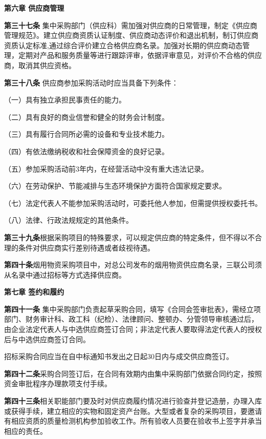 \begin{center}
\textbf{第六章 \quad  供应商管理}
\end{center}

\textbf{第三十七条 }\quad 集中采购部门（供应科）需加强对供应商的日常管理，制定《供应商管理规范》。建立供应商资质认证制度、供应商动态评价和退出机制，制订供应商资质认定标准,通过综合评价建立合格供应商名录。加强对长期的供应商动态管理，定期对产品和服务质量等进行跟踪评审，依据评审意见，对评价不合格的供应商，取消其供应资格。

\textbf{第三十八条} \quad  供应商参加采购活动时应当具备下列条件：

（一）具有独立承担民事责任的能力。

（二）具有良好的商业信誉和健全的财务会计制度。

（三）具有履行合同所必需的设备和专业技术能力。

（四）有依法缴纳税收和社会保障资金的良好记录。

（五）参加采购活动前3年内，在经营活动中没有重大违法记录。

（六）在劳动保护、节能减排与生态环境保护方面符合国家规定要求。

（七）法定代表人不能参加采购活动时，可委托他人参加，但需提供授权委托书。

（八）法律、行政法规规定的其他条件。

\textbf{第三十九条}\quad  根据采购项目的特殊要求，可以规定供应商的特定条件，但不得以不合理的条件对供应商实行差别待遇或者歧视待遇。

\textbf{第四十条}\quad  烟用物资采购项目中，对总公司发布的烟用物资供应商名录，三联公司须从名录中通过招标等方式选择供应商。

\begin{center}
\textbf{第七章 \quad  签约和履约}
\end{center}

\textbf{第四十一条 }\quad 集中采购部门负责起草采购合同，填写《合同会签审批表》，需经立项部门、财务审计科、政工科（纪检）、法律顾问、整顿办、分管领导审核通过后，由企业法定代表人与中选供应商签订合同；非法定代表人要取得法定代表人的授权后与中选供应商签订合同。

招标采购合同应当在自中标通知书发出之日起30日内与成交供应商签订。

\textbf{第四十二条}\quad  采购合同签订后，在合同有效期内由集中采购部门依据合同约定，按照资金审批程序办理款项支付手续。

\textbf{第四十三条}\quad  相关职能部门要及时对供应商履约情况进行验查并登记造册，办理入库或获得手续，建立相应的实物和固定资产台账。大型或者复杂的采购项目，要邀请有相应资质的质量检测机构参加验收工作。所有验收人员要在验收书上签字并承当相应的责任。

